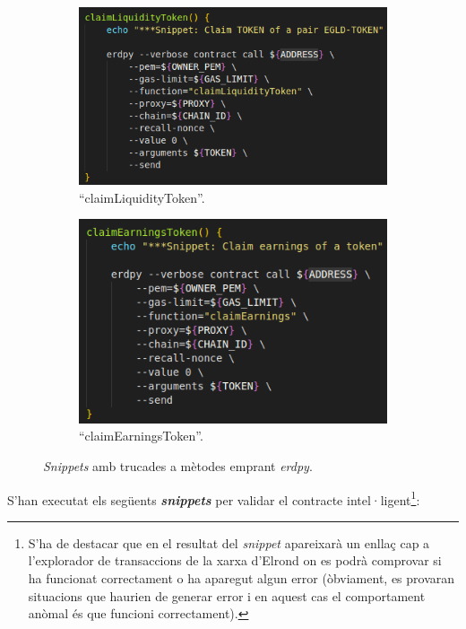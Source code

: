 \documentclass[11pt,a4paper]{article}
\begin{document}
\begin{figure}[!htb]
\begin{subfigure}[b]{0.46\textwidth}
	  \includegraphics[width=\linewidth]{test-liquiditytoken.png}
	  \caption{``claimLiquidityToken''.}\label{fig:test-liquiditytoken}
	\end{subfigure}\hfill
	\begin{subfigure}[b]{0.39\textwidth}
	  \includegraphics[width=\linewidth]{test-getearnings.png}
	  \caption{``claimEarningsToken''.}\label{fig:test-getearnings}
	\end{subfigure}\hfill
	\caption{\textit{Snippets} amb trucades a mètodes emprant \textit{erdpy}.}
\end{figure}

S'han executat els següents \textbf{\textit{snippets}} per validar el contracte intel·ligent\footnote{S'ha de destacar que en el resultat del \textit{snippet} apareixarà un enllaç cap a l'explorador de transaccions de la xarxa d'Elrond on es podrà comprovar si ha funcionat correctament o ha aparegut algun error (òbviament, es provaran situacions que haurien de generar error i en aquest cas el comportament anòmal és que funcioni correctament).}:
\end{document}
